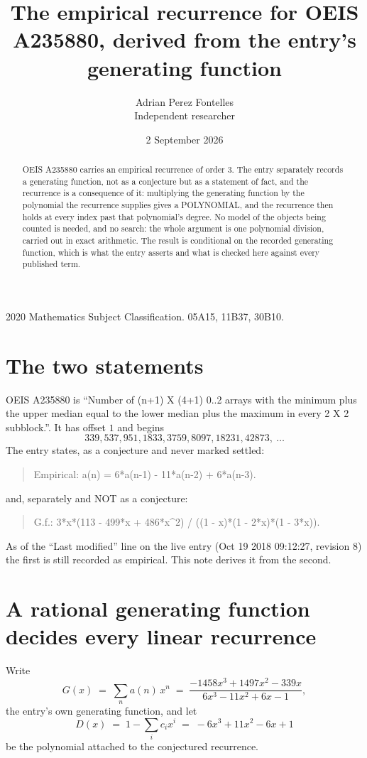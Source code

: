\documentclass[11pt,a4paper]{article}
\title{The empirical recurrence for OEIS A235880, derived from the entry's generating function}
\author{Adrian Perez Fontelles\\ \small Independent researcher}
\date{2 September 2026}
\theoremstyle{plain}
\theoremstyle{definition}
\begin{document}
\maketitle

\begin{abstract}
OEIS A235880 carries an empirical recurrence of order $3$. The entry separately records a
generating function, not as a conjecture but as a statement of fact, and the recurrence is a
consequence of it: multiplying the generating function by the polynomial the recurrence
supplies gives a POLYNOMIAL, and the recurrence then holds at every index past that
polynomial's degree. No model of the objects being counted is needed, and no search: the
whole argument is one polynomial division, carried out in exact arithmetic. The result is
conditional on the recorded generating function, which is what the entry asserts and what is
checked here against every published term.
\end{abstract}

\noindent\small 2020 Mathematics Subject Classification. 05A15, 11B37, 30B10.\normalsize

\section{The two statements}

OEIS A235880 is ``Number of (n+1) X (4+1) 0..2 arrays with the minimum plus the upper median equal to the lower median plus the maximum in every 2 X 2 subblock.''. It has offset $1$ and begins
\[
339, 537, 951, 1833, 3759, 8097, 18231, 42873,\ \dots
\]
The entry states, as a conjecture and never marked settled:
\begin{quote}
Empirical: a(n) = 6*a(n-1) - 11*a(n-2) + 6*a(n-3).
\end{quote}
and, separately and NOT as a conjecture:
\begin{quote}
G.f.: 3*x*(113 - 499*x + 486*x\^{}2) / ((1 - x)*(1 - 2*x)*(1 - 3*x)).
\end{quote}
As of the ``Last modified'' line on the live entry (Oct 19 2018 09:12:27, revision 8) the first is still
recorded as empirical. This note derives it from the second.

\section{A rational generating function decides every linear recurrence}

Write
\[
G(x)\;=\;\sum_{n}a(n)\,x^{n}\;=\;\frac{- 1458 x^{3} + 1497 x^{2} - 339 x}{6 x^{3} - 11 x^{2} + 6 x - 1},
\]
the entry's own generating function, and let
\[
D(x)\;=\;1-\sum_i c_i x^{i}\;=\;- 6 x^{3} + 11 x^{2} - 6 x + 1
\]
be the polynomial attached to the conjectured recurrence.
\end{document}
